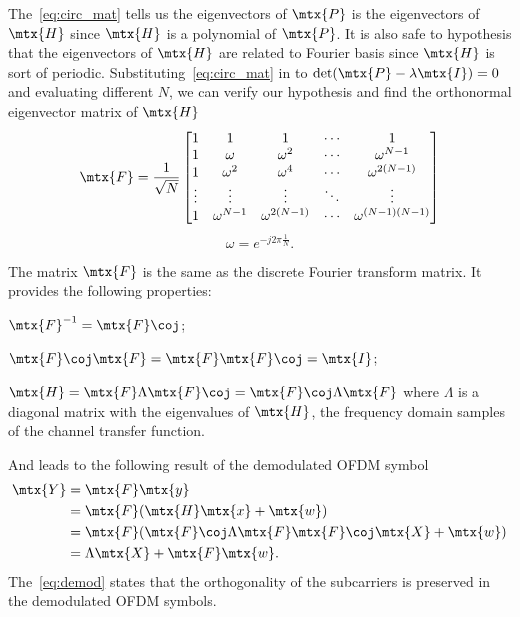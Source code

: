 The~\cref{eq:circ_mat} tells us the eigenvectors of $\mtx{P}$ is the eigenvectors of $\mtx{H}$ since $\mtx{H}$ is a polynomial of $\mtx{P}$. It is also safe to hypothesis that the eigenvectors of $\mtx{H}$ are related to Fourier basis since $\mtx{H}$ is sort of periodic. Substituting~\cref{eq:circ_mat} in to $\det(\mtx{P}-\lambda\mtx{I})=0$ and evaluating different $N$, we can verify our hypothesis and find the orthonormal eigenvector matrix of $\mtx{H}$
\begin{equation}
    \mtx{F} = \frac{1}{\sqrt{N}}
    \begin{bmatrix}
        1 & 1 & 1 & \cdots & 1 \\
        1 & \omega & \omega^2 & \cdots & \omega^{N-1} \\
        1 & \omega^2 & \omega^4 & \cdots & \omega^{2(N-1)} \\
        \vdots & \vdots & \vdots & \ddots & \vdots \\
        1 & \omega^{N-1} & \omega^{2(N-1)} & \cdots & \omega^{(N-1)(N-1)}
    \end{bmatrix}
\end{equation}
\begin{equation}
    \omega = e^{-j2\pi\frac{1}{N}}.
\end{equation}

The matrix $\mtx{F}$ is the same as the discrete Fourier transform matrix. It provides the following properties:
\begin{enumerate*}[(i)]
    \item $\mtx{F}^{-1} = \mtx{F}\coj$;
    \item $\mtx{F}\coj\mtx{F}=\mtx{F}\mtx{F}\coj=\mtx{I}$;
    \item $\mtx{H}=\mtx{F}\Lambda\mtx{F}\coj=\mtx{F}\coj\Lambda\mtx{F}$ where $\Lambda$ is a diagonal matrix with the eigenvalues of $\mtx{H}$, \ie the frequency domain samples of the channel transfer function.
\end{enumerate*}
And leads to the following result of the demodulated OFDM symbol
\begin{equation}
    \label{eq:demod}
    \begin{aligned}
        \mtx{Y}
        &= \mtx{F}\mtx{y} \\
        &= \mtx{F}(\mtx{H}\mtx{x}+\mtx{w}) \\
        &= \mtx{F}(\mtx{F}\coj\Lambda\mtx{F}\mtx{F}\coj\mtx{X}+\mtx{w}) \\
        &= \Lambda\mtx{X} + \mtx{F}\mtx{w}.
    \end{aligned}
\end{equation}
The~\cref{eq:demod} states that the orthogonality of the subcarriers is preserved in the demodulated OFDM symbols.

